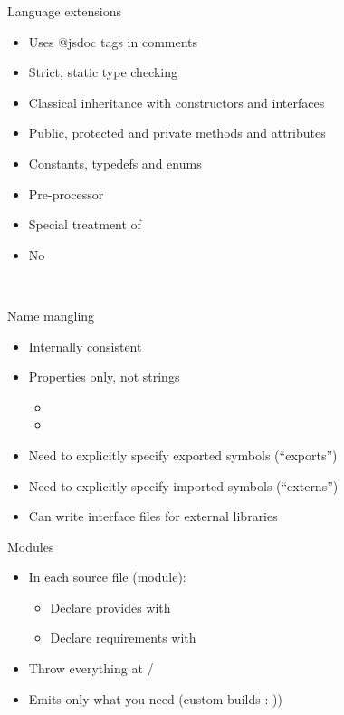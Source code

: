 \documentclass{powerdot}
\begin{document}
\begin{slide}{Language extensions}
\begin{itemize}
\item Uses @jsdoc tags in comments
\item Strict, static type checking
\item Classical inheritance with constructors and interfaces
\item Public, protected and private methods and attributes
\item Constants, typedefs and enums
\item Pre-processor
\item Special treatment of 
\item No 
\end{itemize}
 \\
\end{slide}

\begin{slide}{Name mangling}
\begin{itemize}
\item Internally consistent
\item Properties only, not strings
\begin{itemize}
\item {}
\item {}
\end{itemize}
\item Need to explicitly specify exported symbols (``exports'')
\item Need to explicitly specify imported symbols (``externs'')
\item Can write interface files for external libraries
\end{itemize}
\end{slide}

\begin{slide}{Modules}
\begin{itemize}
\item In each source file (module):
\begin{itemize}
\item Declare provides with 
\item Declare requirements with 
\end{itemize}
\item Throw everything at /
\item Emits only what you need (custom builds :-))
\end{itemize}
\end{slide}
\end{document}
